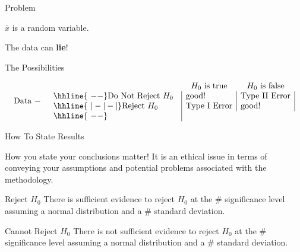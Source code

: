 \begin{frame}{Problem}

  \vfill

  $\bar{x}$ is a random variable.

  \vfill

  The data can \textbf{lie}!

  \vfill
  
\end{frame}


\begin{frame}{The Possibilities}

  \begin{eqnarray*}
    \mathrm{Data~-} & &
      \begin{array}{l@{\hspace{1em}}|l|l|} 
        \multicolumn{1}{c}{~} & \multicolumn{1}{c}{H_0 \mathrm{~is~true}} & \multicolumn{1}{c}{H_0 \mathrm{~is~false}} \\ 
               \hhline{~--}
        \mathrm{Do~Not~Reject~}H_0 & \mathrm{good!} & \mathrm{Type~II~Error} \\ \hhline{~|-|-|}
        \mathrm{Reject~}H_0 & \mathrm{Type~I~Error} & \mathrm{good!} \\ \hhline{~--}
      \end{array}
  \end{eqnarray*}
  
\end{frame}


\begin{frame}{How To State Results}

  How you state your conclusions matter! It is an ethical issue in
  terms of conveying your assumptions and potential problems
  associated with the methodology.

  \begin{block}{Reject $H_0$}
    There is sufficient evidence to reject $H_0$ at the \#
    significance level assuming a normal distribution and a \#
    standard deviation.
  \end{block}

  \begin{block}{Cannot Reject $H_0$}
    There is not sufficient evidence to reject $H_0$ at the \#
    significance level assuming a normal distribution and a \#
    standard deviation.
  \end{block}

  
\end{frame}

